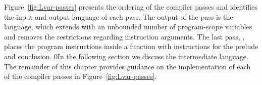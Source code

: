 \documentclass[7x10]{TimesAPriori_MIT}%
\def\racketEd{0}
\def\edition{1}
\newcommand{\racket}[1]{{\if\edition\racketEd{#1}\fi}}
\begin{document}
Figure~\ref{fig:Lvar-passes} presents the ordering of the compiler
passes and identifies the input and output language of each pass.
%
The output of the  pass is the \LangXVar{}
language, which extends \LangXInt{} with an unbounded number of
program-scope variables and removes the restrictions regarding
instruction arguments.
%
The last pass, , places the program
instructions inside a  function with instructions for the
prelude and conclusion.
%
\racket{In the following section we discuss the \LangCVar{}
  intermediate language.}
%
The remainder of this chapter provides guidance on the implementation
of each of the compiler passes in Figure~\ref{fig:Lvar-passes}.



\newcommand{\CvarGrammarRacket}{
\begin{array}{lcl}
\Atm &::=& \Int \MID \Var \\
\Exp &::=& \Atm \MID \CREAD{} \MID \CNEG{\Atm} \MID \CADD{\Atm}{\Atm} \MID \CSUB{\Atm}{\Atm}\\
\Stmt &::=& \CASSIGN{\Var}{\Exp} \\
\Tail &::= & \CRETURN{\Exp} \MID \Stmt~\Tail 
\end{array}
}
\newcommand{\CvarASTRacket}{
\begin{array}{lcl}
\Atm &::=& \INT{\Int} \MID \VAR{\Var} \\
\Exp &::=& \Atm \MID \READ{} \MID \NEG{\Atm} \\
 &\MID& \ADD{\Atm}{\Atm} \MID \SUB{\Atm}{\Atm}\\
\Stmt &::=& \ASSIGN{\VAR{\Var}}{\Exp} \\
\Tail &::= & \RETURN{\Exp} \MID \SEQ{\Stmt}{\Tail} 
\end{array}
}
\end{document}
